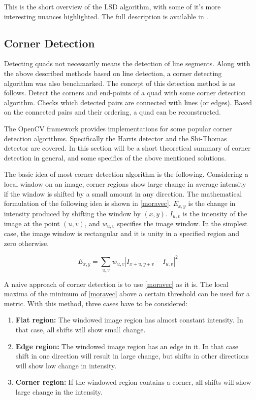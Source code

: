 This is the short overview of the LSD algorithm, with some of it's more interesting nuances highlighted.
The full description is available in \cite{LSDDet}.

\subsection{Corner Detection}

Detecting quads not necessarily means the detection of line segments.
Along with the above described methods based on line detection, a corner detecting algorithm was also benchmarked.
The concept of this detection method is as follows.
Detect the corners and end-points of a quad with some corner detection algorithm.
Checks which detected pairs are connected with lines (or edges).
Based on the connected pairs and their ordering, a quad can be reconstructed.

The OpenCV framework provides implementations for some popular corner detection algorithms.
Specifically the Harris detector and the Shi-Thomas detector are covered.
In this section will be a short theoretical summary of corner detection in general, and some specifics of the above mentioned solutions.

The basic idea of most corner detection algorithm is the following.
Considering a local window on an image, corner regions show large change in average intensity if the window is shifted by a small amount in any direction.
The mathematical formulation of the following idea is shown in \eqref{moravec}.
$E_{x,y}$ is the change in intensity produced by shifting the window by $(x,y)$.
$I_{u,v}$ is the intensity of the image at the point $(u,v)$, and $w_{u,v}$ specifies the image window.
In the simplest case, the image window is rectangular and it is unity in a specified region and zero otherwise.

\begin{equation}
	E_{x,y} = \sum_{u,v} w_{u,v} | I_{x+u,y+v}-I_{u,v} |^2
	\label{eq:moravec}
\end{equation}

A naive approach of corner detection is to use \eqref{moravec} as it is.
The local maxima of the minimum of \eqref{moravec} above a certain threshold can be used for a metric.
With this method, three cases have to be considered:
\begin{enumerate}
	\item \textbf{Flat region:} The windowed image region has almost constant intensity. In that case, all shifts will show small change.
	\item \textbf{Edge region:} The windowed image region has an edge in it. In that case shift in one direction will result in large change, but shifts in other directions will show low change in intensity.
	\item \textbf{Corner region:} If the windowed region contains a corner, all shifts will show large change in the intensity.
\end{enumerate}

